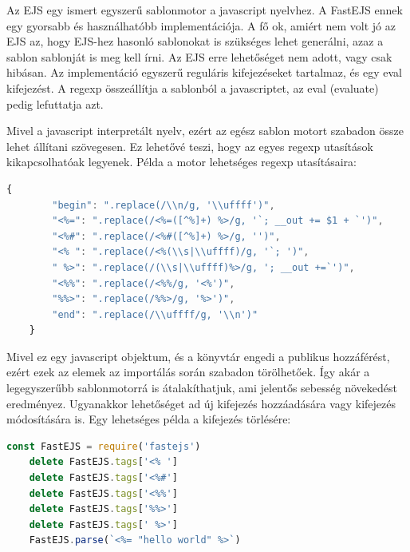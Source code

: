 \documentclass[a4paper,12pt,oneside]{report}
\begin{document}
\begin{justify}

	Az EJS egy ismert egyszerű sablonmotor a javascript nyelvhez. A FastEJS ennek egy gyorsabb és használhatóbb implementációja. A fő ok, amiért nem volt jó az EJS az, hogy EJS-hez hasonló sablonokat is szükséges lehet generálni, azaz a sablon sablonját is meg kell írni. Az EJS erre lehetőséget nem adott, vagy csak hibásan. Az implementáció egyszerű reguláris kifejezéseket tartalmaz, és egy eval kifejezést. A regexp összeállítja a sablonból a javascriptet, az eval (evaluate) pedig lefuttatja azt.

	Mivel a javascript interpretált nyelv, ezért az egész sablon motort szabadon össze lehet állítani szövegesen. Ez lehetővé teszi, hogy az egyes regexp utasítások kikapcsolhatóak legyenek. Példa a motor lehetséges regexp utasításaira:

	\begin{lstlisting}[language=javascript]
	{
		"begin": ".replace(/\\n/g, '\\uffff')",
		"<%=": ".replace(/<%=([^%]+) %>/g, '`; __out += $1 + `')",
		"<%#": ".replace(/<%#([^%]+) %>/g, '')",
		"<% ": ".replace(/<%(\\s|\\uffff)/g, '`; ')",
		" %>": ".replace(/(\\s|\\uffff)%>/g, '; __out +=`')",
		"<%%": ".replace(/<%%/g, '<%')",
		"%%>": ".replace(/%%>/g, '%>')",
		"end": ".replace(/\\uffff/g, '\\n')"
	}
	\end{lstlisting}

	Mivel ez egy javascript objektum, és a könyvtár engedi a publikus hozzáférést, ezért ezek az elemek az importálás során szabadon törölhetőek. Így akár a legegyszerűbb sablonmotorrá is átalakíthatjuk, ami jelentős sebesség növekedést eredményez. Ugyanakkor lehetőséget ad új kifejezés hozzáadására vagy kifejezés módosítására is. Egy lehetséges példa a kifejezés törlésére:

	\begin{lstlisting}[language=javascript]
	const FastEJS = require('fastejs')
	delete FastEJS.tags['<% ']
	delete FastEJS.tags['<%#']
	delete FastEJS.tags['<%%']
	delete FastEJS.tags['%%>']
	delete FastEJS.tags[' %>']
	FastEJS.parse(`<%= "hello world" %>`)
	\end{lstlisting}

\end{justify}
\end{document}
